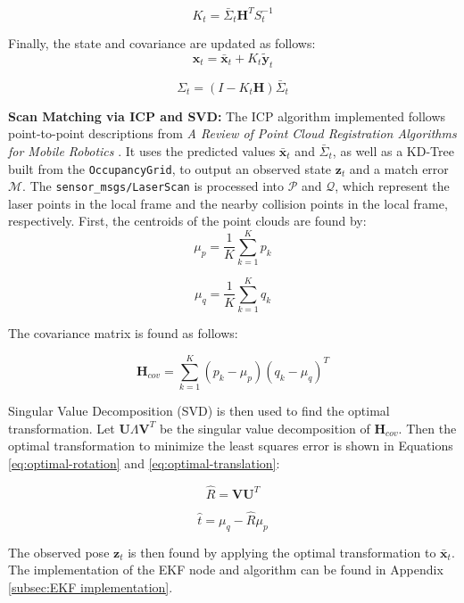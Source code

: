 \begin{equation}\label{eq:ekf-kalman-gain}
    K_t = \bar{\Sigma}_t \textbf{H}^T S_t^{-1}
\end{equation}

Finally, the state and covariance are updated as follows:
\begin{equation}\label{eq:ekf-state-update}
    {\textbf{x}}_t = \bar{\textbf{x}}_t + K_t \tilde{\textbf{y}}_t
\end{equation}

\begin{equation}\label{eq:ekf-cov-update}
    \Sigma_t = (I - K_t \textbf{H}) \bar{\Sigma}_t
\end{equation}

\textbf{Scan Matching via ICP and SVD:} 
The ICP algorithm implemented follows point-to-point descriptions from \textit{A Review of Point Cloud Registration Algorithms for Mobile Robotics} \cite{pomerleau2015review}.
It uses the predicted values $\bar{\textbf{x}}_t$ and $\bar{\Sigma}_t$, as well as a KD-Tree built from the \texttt{OccupancyGrid}, to output an observed state $\textbf{z}_t$ and a match error $\mathcal{M}$.
The \texttt{sensor\_msgs/LaserScan} is processed into $\mathcal{P}$ and $\mathcal{Q}$, which represent the laser points in the local frame and the nearby collision points in the local frame, respectively.
First, the centroids of the point clouds are found by:
\begin{equation}
    \mu_p = \frac{1}{K} \sum_{k = 1}^{K} p_k
\end{equation}

\begin{equation}
    \mu_q = \frac{1}{K} \sum_{k = 1}^{K} q_k
\end{equation}

The covariance matrix is found as follows:

\begin{equation}
    \textbf{H}_{cov} = \sum_{k = 1}^{K} (p_k - \mu_p) (q_k - \mu_q)^T
\end{equation}

Singular Value Decomposition (SVD) is then used to find the optimal transformation.
Let $\textbf{U}\varLambda \textbf{V}^T$ be the singular value decomposition of $\textbf{H}_{cov}$.
Then the optimal transformation to minimize the least squares error is shown in Equations \ref{eq:optimal-rotation} and \ref{eq:optimal-translation}:

\begin{equation}\label{eq:optimal-rotation}
    \widehat{R} = \textbf{V}\textbf{U}^T
\end{equation}

\begin{equation}\label{eq:optimal-translation}
    \widehat{t} = \mu_q - \widehat{R}\mu_p
\end{equation}

The observed pose $\textbf{z}_t$ is then found by applying the optimal transformation to $\bar{\textbf{x}}_t$.
The implementation of the EKF node and algorithm can be found in Appendix \ref{subsec:EKF implementation}.